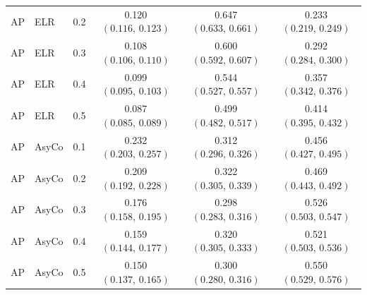 \begin{small}
\begin{longtable}{lllccc}
AP & ELR & 0.2 & 0.120 $(0.116,\,0.123)$ & 0.647 $(0.633,\,0.661)$ & 0.233 $(0.219,\,0.249)$ \\
AP & ELR & 0.3 & 0.108 $(0.106,\,0.110)$ & 0.600 $(0.592,\,0.607)$ & 0.292 $(0.284,\,0.300)$ \\
AP & ELR & 0.4 & 0.099 $(0.095,\,0.103)$ & 0.544 $(0.527,\,0.557)$ & 0.357 $(0.342,\,0.376)$ \\
AP & ELR & 0.5 & 0.087 $(0.085,\,0.089)$ & 0.499 $(0.482,\,0.517)$ & 0.414 $(0.395,\,0.432)$ \\
AP & AsyCo & 0.1 & 0.232 $(0.203,\,0.257)$ & 0.312 $(0.296,\,0.326)$ & 0.456 $(0.427,\,0.495)$ \\
AP & AsyCo & 0.2 & 0.209 $(0.192,\,0.228)$ & 0.322 $(0.305,\,0.339)$ & 0.469 $(0.443,\,0.492)$ \\
AP & AsyCo & 0.3 & 0.176 $(0.158,\,0.195)$ & 0.298 $(0.283,\,0.316)$ & 0.526 $(0.503,\,0.547)$ \\
AP & AsyCo & 0.4 & 0.159 $(0.144,\,0.177)$ & 0.320 $(0.305,\,0.333)$ & 0.521 $(0.503,\,0.536)$ \\
AP & AsyCo & 0.5 & 0.150 $(0.137,\,0.165)$ & 0.300 $(0.280,\,0.316)$ & 0.550 $(0.529,\,0.576)$ \\
\bottomrule
\end{longtable}
\end{small}
